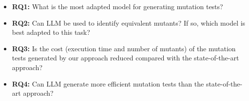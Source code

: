 \begin{itemize}


\item \textbf{RQ1:} What is the most adapted model for generating mutation tests? 

\item \textbf{RQ2:} Can LLM be used to identify equivalent mutants? If so, which model is best adapted to this task? 

    \item \textbf{RQ3:} Is the cost (execution time and number of mutants) of the mutation tests generated by our approach reduced compared with the state-of-the-art approach?
    
\item \textbf{RQ4:} Can LLM generate more efficient mutation tests than the
state-of-the-art approach? 

\end{itemize}

